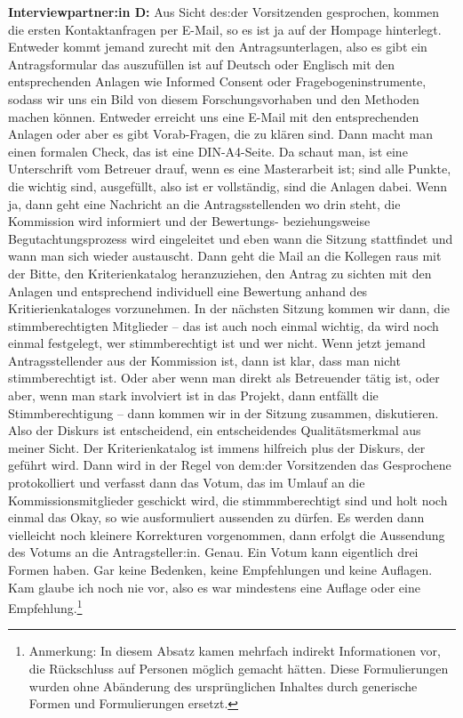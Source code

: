 \documentclass[a4paper,12pt,twoside]{scrreprt}
\begin{document}
\textbf{Interviewpartner:in D:} Aus Sicht des:der Vorsitzenden gesprochen, kommen die ersten Kontaktanfragen per E-Mail, so es ist ja auf der Hompage hinterlegt. Entweder kommt jemand zurecht mit den Antragsunterlagen, also es gibt ein Antragsformular das auszufüllen ist auf Deutsch oder Englisch mit den entsprechenden Anlagen wie Informed Consent oder Fragebogeninstrumente, sodass wir uns ein Bild von diesem Forschungsvorhaben und den Methoden machen können. Entweder erreicht uns eine E-Mail mit den entsprechenden Anlagen oder aber es gibt Vorab-Fragen, die zu klären sind. Dann macht man einen formalen Check, das ist eine DIN-A4-Seite. Da schaut man, ist eine Unterschrift vom Betreuer drauf, wenn es eine Masterarbeit ist; sind alle Punkte, die wichtig sind, ausgefüllt, also ist er vollständig, sind die Anlagen dabei. Wenn ja, dann geht eine Nachricht an die Antragsstellenden wo drin steht, die Kommission wird informiert und der Bewertungs- beziehungsweise Begutachtungsprozess wird eingeleitet und eben wann die Sitzung stattfindet und wann man sich wieder austauscht. Dann geht die Mail an die Kollegen raus mit der Bitte, den Kriterienkatalog heranzuziehen, den Antrag zu sichten mit den Anlagen und entsprechend individuell eine Bewertung anhand des Kritierienkataloges vorzunehmen. In der nächsten Sitzung kommen wir dann, die stimmberechtigten Mitglieder -- das ist auch noch einmal wichtig, da wird noch einmal festgelegt, wer stimmberechtigt ist und wer nicht. Wenn jetzt jemand Antragsstellender aus der Kommission ist, dann ist klar, dass man nicht stimmberechtigt ist. Oder aber wenn man direkt als Betreuender tätig ist, oder aber, wenn man stark involviert ist in das Projekt, dann entfällt die Stimmberechtigung -- dann kommen wir in der Sitzung zusammen, diskutieren. Also der Diskurs ist entscheidend, ein entscheidendes Qualitätsmerkmal aus meiner Sicht. Der Kriterienkatalog ist immens hilfreich plus der Diskurs, der geführt wird. Dann wird in der Regel von dem:der Vorsitzenden das Gesprochene protokolliert und verfasst dann das Votum, das im Umlauf an die Kommissionsmitglieder geschickt wird, die stimmmberechtigt sind und holt noch einmal das Okay, so wie ausformuliert aussenden zu dürfen. Es werden dann vielleicht noch kleinere Korrekturen vorgenommen, dann erfolgt die Aussendung des Votums an die Antragsteller:in. Genau. Ein Votum kann eigentlich drei Formen haben. Gar keine Bedenken, keine Empfehlungen und keine Auflagen. Kam glaube ich noch nie vor, also es war mindestens eine Auflage oder eine Empfehlung.\footnote{Anmerkung: In diesem Absatz kamen mehrfach indirekt Informationen vor, die Rückschluss auf Personen möglich gemacht hätten. Diese Formulierungen wurden ohne Abänderung des ursprünglichen Inhaltes durch generische Formen und Formulierungen ersetzt.}
\end{document}
